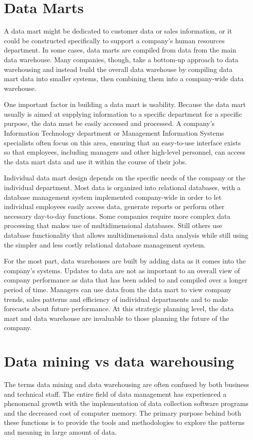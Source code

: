 \section{Data Marts}
A data mart might be dedicated to customer data or sales information, or it could be constructed specifically to support a company's human resources department. In some cases, data marts are compiled from data from the main data warehouse. Many companies, though, take a bottom-up approach to data warehousing and instead build the overall data warehouse by compiling data mart data into smaller systems, then combining them into a company-wide data warehouse.

One important factor in building a data mart is usability. Because the data mart usually is aimed at supplying information to a specific department for a specific purpose, the data must be easily accessed and processed. A company's Information Technology department or Management Information Systems specialists often focus on this area, ensuring that an easy-to-use interface exists so that employees, including managers and other high-level personnel, can access the data mart data and use it within the course of their jobs.

Individual data mart design depends on the specific needs of the company or the individual department. Most data is organized into relational databases, with a database management system implemented company-wide in order to let individual employees easily access data, generate reports or perform other necessary day-to-day functions. Some companies require more complex data processing that makes use of multidimensional databases. Still others use database functionality that allows multidimensional data analysis while still using the simpler and less costly relational database management system.

For the most part, data warehouses are built by adding data as it comes into the company's systems. Updates to data are not as important to an overall view of company performance as data that has been added to and compiled over a longer period of time. Managers can use data from the data mart to view company trends, sales patterns and efficiency of individual departments and to make forecasts about future performance. At this strategic planning level, the data mart and data warehouse are invaluable to those planning the future of the company.
\section{Data mining vs data warehousing} 
The terms data mining and data warehousing are often confused by both business and technical staff. The entire field of data management has experienced a phenomenal growth with the implementation of data collection software programs and the decreased cost of computer memory. The primary purpose behind both these functions is to provide the tools and methodologies to explore the patterns and meaning in large amount of data.

